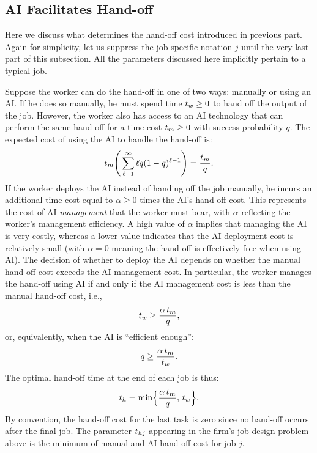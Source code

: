 \documentclass{article}
\theoremstyle{plain}
\theoremstyle{plain}
\begin{document}
\subsection{AI Facilitates Hand-off}
Here we discuss what determines the hand-off cost introduced in previous part.
Again for simplicity, let us suppress the job-specific notation $j$ until the very last part of this subsection.
All the parameters discussed here implicitly pertain to a typical job.

Suppose the worker can do the hand-off in one of two ways: manually or using an AI.
If he does so manually, he must spend time $t_{w} \geq 0$ to hand off the output of the job.
However, the worker also has access to an AI technology that can perform the same hand-off for a time cost $t_{m} \geq 0$ with success probability $q$.
The expected cost of using the AI to handle the hand-off is:
\[
t_{m} \Bigg( \sum_{\ell=1}^{\infty} \ell q (1 - q)^{\ell - 1} \Bigg) = \frac{t_{m}}{q}.
\]
If the worker deploys the AI instead of handing off the job manually, he incurs an additional time cost equal to $\alpha \geq 0$ times the AI’s hand-off cost.
This represents the cost of AI \emph{management} that the worker must bear, with $\alpha$ reflecting the worker's management efficiency.
A high value of $\alpha$ implies that managing the AI is very costly, whereas a lower value indicates that the AI deployment cost is relatively small (with $\alpha = 0$ meaning the hand-off is effectively free when using AI).
The decision of whether to deploy the AI depends on whether the manual hand-off cost exceeds the AI management cost.
In particular, the worker manages the hand-off using AI if and only if the AI management cost is less than the manual hand-off cost, i.e.,
\[
t_{w} \geq \frac{\alpha \, t_{m}}{q},
\]
or, equivalently, when the AI is “efficient enough”:
\[
q \geq \frac{\alpha \, t_{m}}{t_{w}}.
\]
The optimal hand-off time at the end of each job is thus:
\[
t_{h} = \min\Bigl\{\frac{\alpha \, t_{m}}{q},\, t_{w}\Bigr\}.
\]
By convention, the hand-off cost for the last task is zero since no hand-off occurs after the final job.
The parameter $t_{hj}$ appearing in the firm's job design problem above is the minimum of manual and AI hand-off cost for job $j$.
\end{document}
